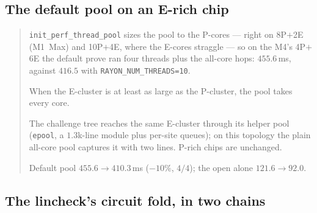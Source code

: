 \documentclass[11pt]{article}
\newcommand{\code}[1]{\texttt{#1}}
\newenvironment{optsummary}{%
  \begin{quote}\small
  \begin{description}
  \setlength{\itemsep}{1pt}\setlength{\parsep}{0pt}\setlength{\topsep}{2pt}
}{%
  \end{description}
  \end{quote}
}
\begin{document}
\subsection{The default pool on an E-rich chip}\label{sec:erichpool}

\begin{optsummary}
\item[Baseline:] \code{init\_perf\_thread\_pool} sizes the pool to the P-cores --- right on 8P$+$2E (M1~Max) and 10P$+$4E, where the E-cores straggle --- so on the M4's 4P$+$6E the default prove ran four threads plus the all-core hops: $455.6\,$ms, against $416.5$ with \code{RAYON\_NUM\_THREADS=10}.
\item[Improvement:] When the E-cluster is at least as large as the P-cluster, the pool takes every core.
\item[Mechanism:] The challenge tree reaches the same E-cluster through its helper pool (\code{epool}, a $1.3$k-line module plus per-site queues); on this topology the plain all-core pool captures it with two lines. P-rich chips are unchanged.
\item[Result:] Default pool $455.6\to410.3\,$ms ($-10\%$, $4/4$); the open alone $121.6\to92.0$.
\end{optsummary}

\subsection{The lincheck's circuit fold, in two chains}\label{sec:cscgather}
\end{document}
